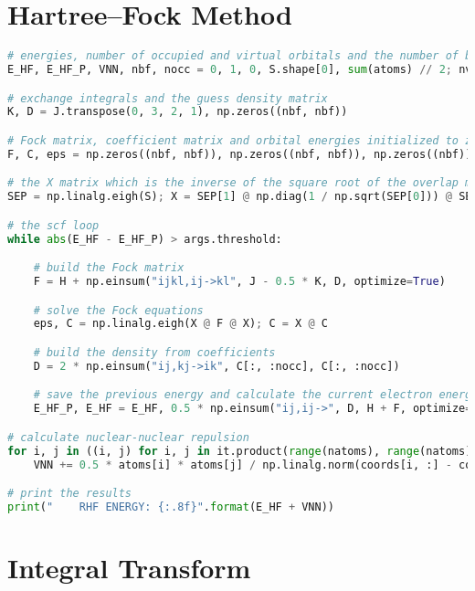 \section*{\texorpdfstring{Hartree--Fock Method\label{sec:hf_code_solution}}{Hartree--Fock Method}}

\raggedbottom\begin{lstlisting}[language=Python, caption={\acrshort{hf} method exercise code solution.}, label=code:hf_solution]
# energies, number of occupied and virtual orbitals and the number of basis functions
E_HF, E_HF_P, VNN, nbf, nocc = 0, 1, 0, S.shape[0], sum(atoms) // 2; nvirt = nbf - nocc

# exchange integrals and the guess density matrix
K, D = J.transpose(0, 3, 2, 1), np.zeros((nbf, nbf))

# Fock matrix, coefficient matrix and orbital energies initialized to zero
F, C, eps = np.zeros((nbf, nbf)), np.zeros((nbf, nbf)), np.zeros((nbf))

# the X matrix which is the inverse of the square root of the overlap matrix
SEP = np.linalg.eigh(S); X = SEP[1] @ np.diag(1 / np.sqrt(SEP[0])) @ SEP[1].T

# the scf loop
while abs(E_HF - E_HF_P) > args.threshold:

    # build the Fock matrix
    F = H + np.einsum("ijkl,ij->kl", J - 0.5 * K, D, optimize=True)

    # solve the Fock equations
    eps, C = np.linalg.eigh(X @ F @ X); C = X @ C

    # build the density from coefficients
    D = 2 * np.einsum("ij,kj->ik", C[:, :nocc], C[:, :nocc])

    # save the previous energy and calculate the current electron energy
    E_HF_P, E_HF = E_HF, 0.5 * np.einsum("ij,ij->", D, H + F, optimize=True)

# calculate nuclear-nuclear repulsion
for i, j in ((i, j) for i, j in it.product(range(natoms), range(natoms)) if i != j):
    VNN += 0.5 * atoms[i] * atoms[j] / np.linalg.norm(coords[i, :] - coords[j, :])

# print the results
print("    RHF ENERGY: {:.8f}".format(E_HF + VNN))
\end{lstlisting}

\section*{\texorpdfstring{Integral Transform\label{sec:int_code_solution}}{Integral Transform}}

